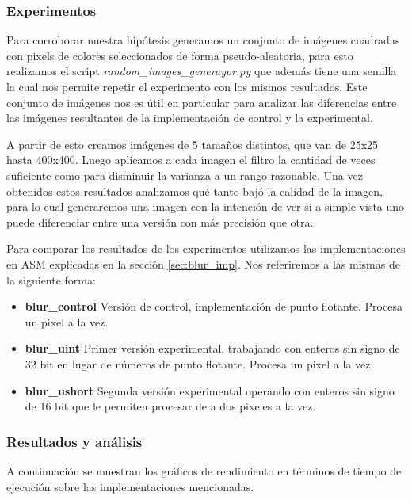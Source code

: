 \subsubsection{Experimentos}

Para corroborar nuestra hipótesis generamos un conjunto de imágenes cuadradas
con pixels de colores seleccionados de forma pseudo-aleatoria, para esto
realizamos el script \textit{random\_images\_generayor.py} que además tiene una semilla
la cual nos permite repetir el experimento con los mismos resultados. Este
conjunto de imágenes nos es útil en particular para analizar las diferencias
entre las imágenes resultantes de la implementación de control y la
experimental.

A partir de esto creamos imágenes de 5 tamaños distintos, que van de 25x25
hasta 400x400. Luego aplicamos a cada imagen el filtro la cantidad de veces
suficiente como para disminuir la varianza a un rango razonable. Una vez obtenidos estos
resultados analizamos qué tanto bajó la calidad de la imagen, para lo cual
generaremos una imagen con la intención de ver si a simple vista uno puede
diferenciar entre una versión con más precisión que otra.

Para comparar los resultados de los experimentos utilizamos las implementaciones
en ASM explicadas en la sección \ref{sec:blur_imp}. Nos referiremos a las mismas
de la siguiente forma:

\begin{itemize}
	\item \textbf{blur\_control}
		Versión de control, implementación de punto flotante. Procesa un pixel a
		la vez.
	\item \textbf{blur\_uint}
		Primer versión experimental, trabajando con enteros sin signo de 32 bit en lugar
		de números de punto flotante. Procesa un pixel a la vez.
	\item \textbf{blur\_ushort}
		Segunda versión experimental operando con enteros sin signo de 16 bit
		que le permiten procesar de a dos pixeles a la vez.
\end{itemize}

\subsubsection{Resultados y análisis}

A continuación se muestran los gráficos de rendimiento en términos de tiempo de
ejecución sobre las implementaciones mencionadas.

